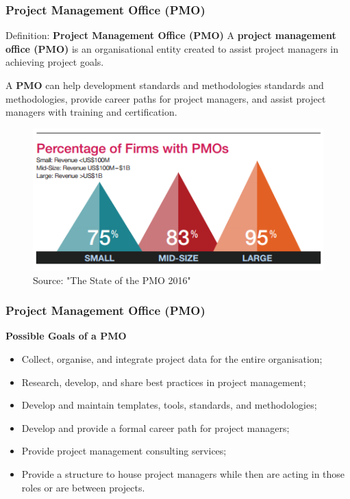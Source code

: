 \documentclass{beamer}
\begin{document}
\begin{frame}
\frametitle{Project Management Office (PMO)}
\begin{block}{Definition: \textbf{Project Management Office (PMO)}}
A \textbf{project management office (PMO)} is an organisational entity created to assist project managers in achieving project goals.
\end{block}
\vspace{0.2cm}
A \textbf{PMO} can help development standards and methodologies standards and methodologies, provide career paths for project managers, and assist project managers with training and certification.
\begin{figure}
\includegraphics[scale=0.4]{PMO}
\caption{Source: "The State of the PMO 2016"}
\end{figure}
\end{frame}

\begin{frame}
\frametitle{Project Management Office (PMO)}
\textbf{Possible Goals of a PMO}
\vspace{0.5cm}
\begin{itemize}
\item Collect, organise, and integrate project data for the entire organisation;
\item Research, develop, and share best practices in project management;
\item Develop and maintain templates, tools, standards, and methodologies;
\item Develop and provide a formal career path for project managers;
\item Provide project management consulting services;
\item Provide a structure to house project managers while then are acting in those roles or are between projects.
\end{itemize}
\end{frame}
\end{document}
